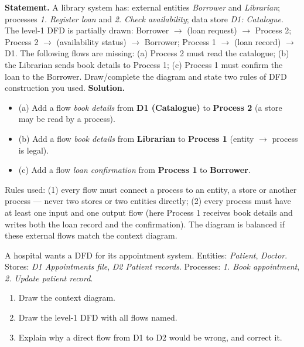 \documentclass[11pt]{article}
\begin{document}
\begin{exoresolu}
\textbf{Statement.} A library system has: external entities \emph{Borrower} and \emph{Librarian}; processes \emph{1. Register loan} and \emph{2. Check availability}; data store \emph{D1: Catalogue}. The level-1 DFD is partially drawn: Borrower $\to$ (loan request) $\to$ Process 2; Process 2 $\to$ (availability status) $\to$ Borrower; Process 1 $\to$ (loan record) $\to$ D1. The following flows are missing: (a) Process 2 must read the catalogue; (b) the Librarian sends book details to Process 1; (c) Process 1 must confirm the loan to the Borrower. Draw/complete the diagram and state two rules of DFD construction you used. \tcblower
\textbf{Solution.}
\begin{itemize}
\item (a) Add a flow \emph{book details} from \textbf{D1 (Catalogue)} to \textbf{Process 2} (a store may be read by a process).
\item (b) Add a flow \emph{book details} from \textbf{Librarian} to \textbf{Process 1} (entity $\to$ process is legal).
\item (c) Add a flow \emph{loan confirmation} from \textbf{Process 1} to \textbf{Borrower}.
\end{itemize}
Rules used: (1) every flow must connect a process to an entity, a store or another process --- never two stores or two entities directly; (2) every process must have at least one input and one output flow (here Process 1 receives book details and writes both the loan record and the confirmation). The diagram is balanced if these external flows match the context diagram.
\end{exoresolu}

\begin{exercice}[Practice]
A hospital wants a DFD for its appointment system. Entities: \emph{Patient}, \emph{Doctor}. Stores: \emph{D1 Appointments file}, \emph{D2 Patient records}. Processes: \emph{1. Book appointment}, \emph{2. Update patient record}.
\begin{enumerate}
\item Draw the context diagram.
\item Draw the level-1 DFD with all flows named.
\item Explain why a direct flow from D1 to D2 would be wrong, and correct it.
\end{enumerate}
\end{exercice}
\end{document}
